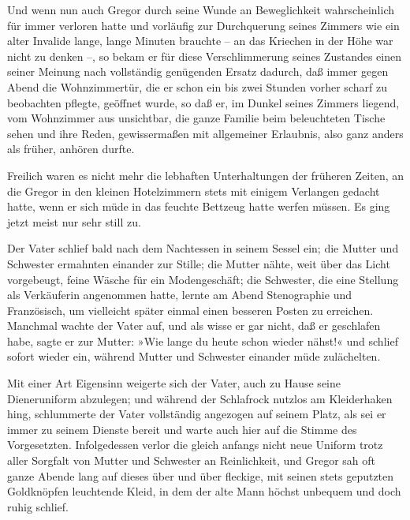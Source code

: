 Und wenn nun auch Gregor durch seine Wunde an Beweglichkeit
wahrscheinlich für immer verloren hatte und vorläufig zur Durchquerung
seines Zimmers wie ein alter Invalide lange, lange Minuten brauchte --
an das Kriechen in der Höhe war nicht zu denken --, so bekam er für
diese Verschlimmerung seines Zustandes einen seiner Meinung nach
vollständig genügenden Ersatz dadurch, daß immer gegen Abend die
Wohnzimmertür, die er schon ein bis zwei Stunden vorher scharf zu
beobachten pflegte, geöffnet wurde, so daß er, im Dunkel seines Zimmers
liegend, vom Wohnzimmer aus unsichtbar, die ganze Familie beim
beleuchteten Tische sehen und ihre Reden, gewissermaßen mit allgemeiner
Erlaubnis, also ganz anders als früher, anhören durfte.

Freilich waren es nicht mehr die lebhaften Unterhaltungen der früheren
Zeiten, an die Gregor in den kleinen Hotelzimmern stets mit einigem
Verlangen gedacht hatte, wenn er sich müde in das feuchte Bettzeug hatte
werfen müssen. Es ging jetzt meist nur sehr still zu.

Der Vater schlief
bald nach dem Nachtessen in seinem Sessel ein; die Mutter und Schwester
ermahnten einander zur Stille; die Mutter nähte, weit über das Licht
vorgebeugt, feine Wäsche für ein Modengeschäft; die Schwester, die eine
Stellung als Verkäuferin angenommen hatte, lernte am Abend Stenographie
und Französisch, um vielleicht später einmal einen besseren Posten zu
erreichen. Manchmal wachte der Vater auf, und als wisse er gar nicht,
daß er geschlafen habe, sagte er zur Mutter: »Wie lange du heute schon
wieder nähst!« und schlief sofort wieder ein, während Mutter und
Schwester einander müde zulächelten.

Mit einer Art Eigensinn weigerte sich der Vater, auch zu Hause seine
Dieneruniform abzulegen; und während der Schlafrock nutzlos am
Kleiderhaken hing, schlummerte der Vater vollständig angezogen auf
seinem Platz, als sei er immer zu seinem Dienste bereit und warte auch
hier auf die Stimme des Vorgesetzten. Infolgedessen verlor die gleich
anfangs nicht neue Uniform trotz aller Sorgfalt von Mutter und Schwester
an Reinlichkeit, und Gregor sah oft ganze Abende lang auf dieses über
und über fleckige, mit seinen stets geputzten Goldknöpfen leuchtende
Kleid, in dem der alte Mann höchst unbequem und doch ruhig schlief.

